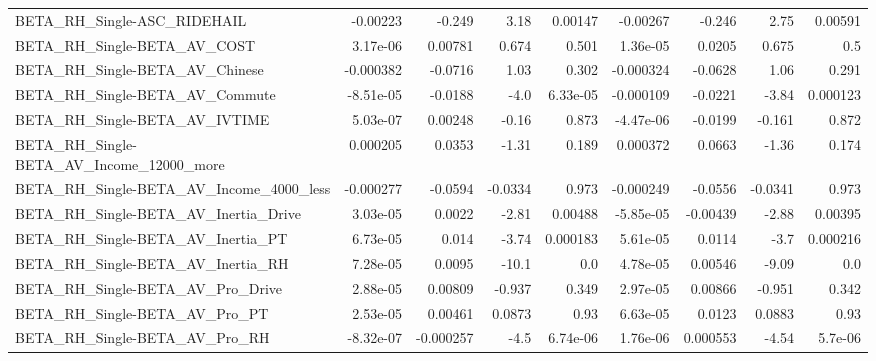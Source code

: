 \begin{tabular}{lrrrrrrrr}
BETA\_RH\_Single-ASC\_RIDEHAIL                        &    -0.00223 &       -0.249 &     3.18 &  0.00147 &   -0.00267 &      -0.246 &         2.75 &       0.00591 \\
BETA\_RH\_Single-BETA\_AV\_COST                        &    3.17e-06 &      0.00781 &    0.674 &    0.501 &   1.36e-05 &      0.0205 &        0.675 &           0.5 \\
BETA\_RH\_Single-BETA\_AV\_Chinese                     &   -0.000382 &      -0.0716 &     1.03 &    0.302 &  -0.000324 &     -0.0628 &         1.06 &         0.291 \\
BETA\_RH\_Single-BETA\_AV\_Commute                     &   -8.51e-05 &      -0.0188 &     -4.0 & 6.33e-05 &  -0.000109 &     -0.0221 &        -3.84 &      0.000123 \\
BETA\_RH\_Single-BETA\_AV\_IVTIME                      &    5.03e-07 &      0.00248 &    -0.16 &    0.873 &  -4.47e-06 &     -0.0199 &       -0.161 &         0.872 \\
BETA\_RH\_Single-BETA\_AV\_Income\_12000\_more           &    0.000205 &       0.0353 &    -1.31 &    0.189 &   0.000372 &      0.0663 &        -1.36 &         0.174 \\
BETA\_RH\_Single-BETA\_AV\_Income\_4000\_less            &   -0.000277 &      -0.0594 &  -0.0334 &    0.973 &  -0.000249 &     -0.0556 &      -0.0341 &         0.973 \\
BETA\_RH\_Single-BETA\_AV\_Inertia\_Drive               &    3.03e-05 &       0.0022 &    -2.81 &  0.00488 &  -5.85e-05 &    -0.00439 &        -2.88 &       0.00395 \\
BETA\_RH\_Single-BETA\_AV\_Inertia\_PT                  &    6.73e-05 &        0.014 &    -3.74 & 0.000183 &   5.61e-05 &      0.0114 &         -3.7 &      0.000216 \\
BETA\_RH\_Single-BETA\_AV\_Inertia\_RH                  &    7.28e-05 &       0.0095 &    -10.1 &      0.0 &   4.78e-05 &     0.00546 &        -9.09 &           0.0 \\
BETA\_RH\_Single-BETA\_AV\_Pro\_Drive                   &    2.88e-05 &      0.00809 &   -0.937 &    0.349 &   2.97e-05 &     0.00866 &       -0.951 &         0.342 \\
BETA\_RH\_Single-BETA\_AV\_Pro\_PT                      &    2.53e-05 &      0.00461 &   0.0873 &     0.93 &   6.63e-05 &      0.0123 &       0.0883 &          0.93 \\
BETA\_RH\_Single-BETA\_AV\_Pro\_RH                      &   -8.32e-07 &    -0.000257 &     -4.5 & 6.74e-06 &   1.76e-06 &    0.000553 &        -4.54 &       5.7e-06 \\

\end{tabular}
